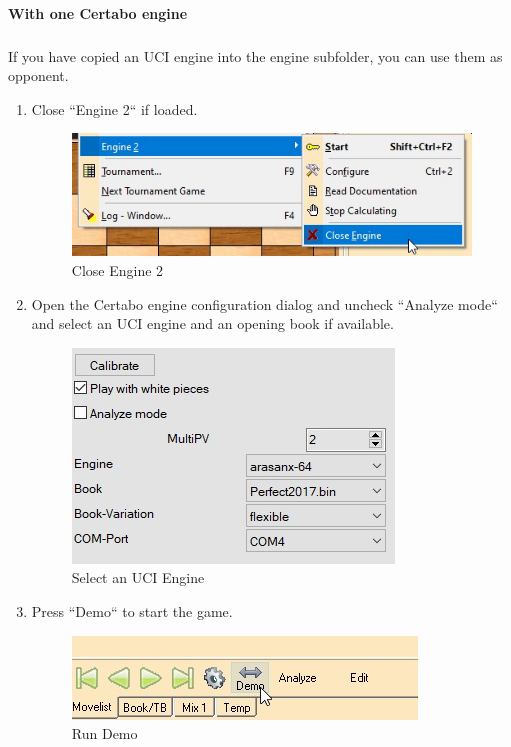 \documentclass[11pt,a4paper]{article}
\begin{document}
\paragraph{With one Certabo engine}
\subparagraph{} If you have copied an UCI engine into the engine subfolder, you can use them as opponent.
\begin{enumerate}
	\item Close ``Engine 2`` if loaded.
	\begin{figure}[H]
		\centering
		\includegraphics[scale=0.7]{arena_closeengine2.jpg}
		\caption{Close Engine 2}
		\label{fig:ArenaCloseEngine2}
	\end{figure}
    \item Open the Certabo engine configuration dialog and uncheck ``Analyze mode`` and select an UCI engine and an opening book if available.
    	\begin{figure}[H]
    	\centering
    	\includegraphics[scale=0.8]{arena_ConfigureCertabo2.jpg}
    	\caption{Select an UCI Engine}
    	\label{fig:ArenaConfigureCertabo2}
    \end{figure}
    \item Press ``Demo`` to start the game.
    \begin{figure}[H]
    	\centering
    	\includegraphics[scale=0.7]{arena_demo.jpg}
    	\caption{Run Demo}
    	\label{fig:ArenaDemo}
    \end{figure}
\end{enumerate}
\end{document}
